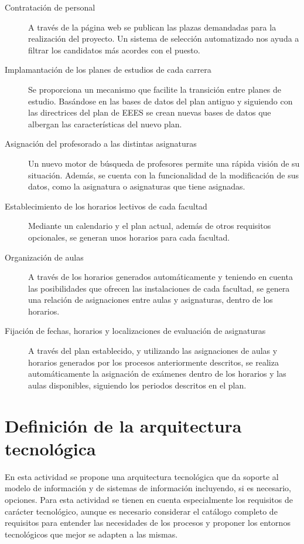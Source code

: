 \documentclass[11pt,a4paper,spanish,twoside]{report}
\begin{document}
\begin{description}
\item[Contratación de personal] A través de la página web se publican las
  plazas demandadas para la realización del proyecto. Un sistema de selección
  automatizado nos ayuda a filtrar los candidatos más acordes con el
  puesto. 
\item[Implamantación de los planes de estudios de cada carrera] Se
  proporciona un mecanismo que facilite la transición entre planes de
  estudio. Basándose en las bases de datos del plan antiguo y siguiendo con
  las directrices del plan de EEES se crean nuevas bases de datos que
  albergan las características del nuevo plan. 
\item[Asignación del profesorado a las distintas asignaturas] Un nuevo motor
  de búsqueda de profesores permite una rápida visión de su
  situación. Además, se cuenta con la funcionalidad de la modificación de
  sus datos, como la asignatura o asignaturas que tiene asignadas. 
\item[Establecimiento de los horarios lectivos de cada facultad] Mediante un
  calendario y el plan actual, además de otros requisitos opcionales, se
  generan unos horarios para cada facultad. 
\item[Organización de aulas] A través de los horarios generados
  automáticamente y teniendo en cuenta las posibilidades que ofrecen las
  instalaciones de cada facultad, se genera una relación de asignaciones
  entre aulas y asignaturas, dentro de los horarios. 
\item[Fijación de fechas, horarios y localizaciones de evaluación de
  asignaturas] A través del plan establecido, y utilizando las asignaciones
  de aulas y horarios generados por los procesos anteriormente descritos, se
  realiza automáticamente la asignación de exámenes dentro de los horarios y
  las aulas disponibles, siguiendo los periodos descritos en el plan. 
\end{description}
 
\chapter{Definición de la arquitectura tecnológica}
En esta actividad se propone una arquitectura tecnológica que da soporte al
modelo de información y de sistemas de información incluyendo, si es
necesario, opciones. Para esta actividad se tienen en cuenta especialmente
los requisitos de carácter tecnológico, aunque es necesario considerar el
catálogo completo de requisitos para entender las necesidades de los procesos
y proponer los entornos tecnológicos que mejor se adapten a las mismas. 
\end{document}
